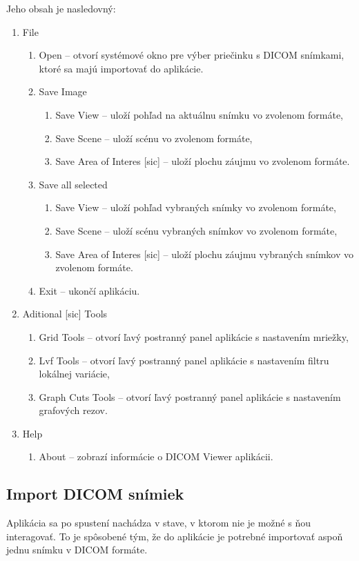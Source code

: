 {Jeho obsah je nasledovný:
\begin {enumerate}
\item {File}
	\begin {enumerate}
		\item {Open -- otvorí systémové okno pre výber priečinku s DICOM snímkami, ktoré sa majú importovať do aplikácie.}
		\item {Save Image}
		\begin {enumerate}
			\item {Save View -- uloží pohľad na aktuálnu snímku vo zvolenom formáte,}
			\item {Save Scene -- uloží scénu vo zvolenom formáte,}
			\item {Save Area of Interes [sic] -- uloží plochu záujmu vo zvolenom formáte.}
		\end {enumerate}
	\item {Save all selected}
		\begin {enumerate}
			\item {Save View -- uloží pohľad vybraných snímky vo zvolenom formáte,}
			\item {Save Scene -- uloží scénu vybraných snímkov vo zvolenom formáte,}
			\item {Save Area of Interes [sic] -- uloží plochu záujmu vybraných snímkov vo zvolenom formáte.}
		\end {enumerate}	
	\item {Exit -- ukončí aplikáciu.}
	\end {enumerate}
\item {Aditional [sic] Tools}
	\begin {enumerate}
	\item {Grid Tools -- otvorí ľavý postranný panel aplikácie s nastavením mriežky,}
	\item {Lvf Tools -- otvorí ľavý postranný panel aplikácie s nastavením filtru lokálnej variácie,}
	\item {Graph Cuts Tools -- otvorí ľavý postranný panel aplikácie s nastavením grafových rezov.}
	\end {enumerate}
\item {Help}
	\begin {enumerate}
	\item {About -- zobrazí informácie o DICOM Viewer aplikácii.}
	\end {enumerate}
\end {enumerate}

\clearpage
\subsection {Import DICOM snímiek}
Aplikácia sa po spustení nachádza v stave, v ktorom nie je možné s ňou interagovať. To je spôsobené tým, že do aplikácie je potrebné importovať aspoň jednu snímku v DICOM formáte.

}
